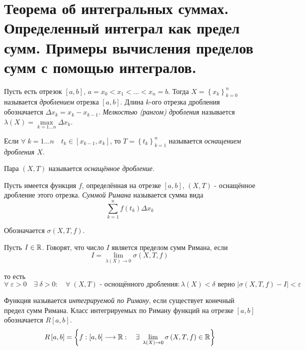 \documentclass[../main.tex]{subfiles}
\begin{document}
\newpage
\section{Теорема об интегральных суммах. Определенный интеграл как предел сумм. Примеры вычисления пределов сумм с помощью интегралов.}
Пусть есть отрезок \( \left[ a,b\right]\), \( a=x_0<x_1< \ldots <x_n=b\). Тогда \( X=\left\{ x_k\right\}_{k=0}^n\) называется \emph{дроблением} отрезка \( \left[ a,b\right]\). 
Длина \( k\)-ого отрезка дробления обозначается \( \Delta x_k=x_k-x_{k-1}\). \emph{Мелкостью (рангом) дробления} называется \( \lambda \left( X\right)= \max\limits_{ k=1 \ldots n} \Delta x_k\). 

Если \( \forall \; k=1 \ldots n\quad t_k \in \left[ x_{k-1}, x_k\right]\), то \( T=\left\{ t_k\right\}_{k=1}^n\) называется \emph{оснащением дробления \( X\)}. 

Пара \( \left( X,T\right)\) называется \emph{оснащённое дробление}. 

Пусть имеется функция \( f\), определённая на отрезке \( \left[ a,b\right]\), \( \left( X,T\right)\) - оснащённое дробление этого отрезка. \emph{Суммой Римана} называется сумма вида 
\[ \sum\limits_{ k=1}^{ n} f\left( t_k\right) \Delta x_k\]

Обозначается \( \sigma\left( X,T,f\right)\).

Пусть \( I \in \mathbb{R} \). Говорят, что число \( I\) является пределом сумм Римана, если 
\[ I= \lim\limits_{ \lambda \left( X\right)\rightarrow 0} \sigma\left( X, T, f\right)\]

то есть 
\[ \forall \; \varepsilon >0\quad  \exists \; \delta >0:\quad \forall \; \left( X,T\right) \text{ - оснощённого дробления}: \lambda \left( X\right)< \delta \text{ верно } \left| \sigma\left( X,T,f\right)-I\right|< \varepsilon \]

Функция называется \emph{интегрируемой по Риману}, если существует конечный предел сумм Римана. Класс интегрируемых по Риману функций на отрезке \( \left[ a,b\right]\) обозначается \( R \left[ a,b\right]\).
\[ R\left[ a,b\right]=\left\{ f:\left[ a,b\right] \longrightarrow \mathbb{R} :\quad \exists \; \lim\limits_{ \lambda \left( X\right)\rightarrow0} \sigma\left( X,T,f\right) \in \mathbb{R} \right\}\]
\end{document}
